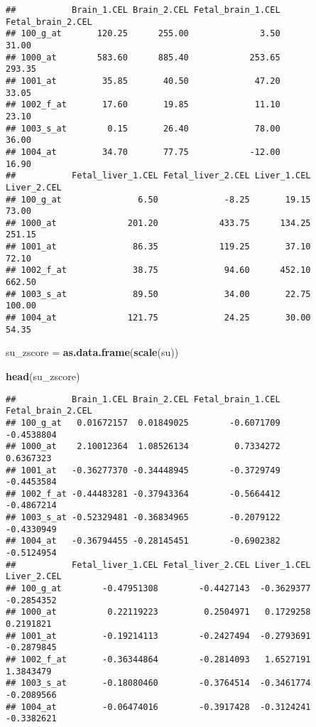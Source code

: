 \documentclass[
]{article}
\newenvironment{Shaded}{\begin{snugshade}}{\end{snugshade}}
\newcommand{\FunctionTok}[1]{\textcolor[rgb]{0.13,0.29,0.53}{\textbf{#1}}}
\newcommand{\NormalTok}[1]{#1}
\newcommand{\OtherTok}[1]{\textcolor[rgb]{0.56,0.35,0.01}{#1}}
\begin{document}
\begin{verbatim}
##           Brain_1.CEL Brain_2.CEL Fetal_brain_1.CEL Fetal_brain_2.CEL
## 100_g_at       120.25      255.00              3.50             31.00
## 1000_at        583.60      885.40            253.65            293.35
## 1001_at         35.85       40.50             47.20             33.05
## 1002_f_at       17.60       19.85             11.10             23.10
## 1003_s_at        0.15       26.40             78.00             36.00
## 1004_at         34.70       77.75            -12.00             16.90
##           Fetal_liver_1.CEL Fetal_liver_2.CEL Liver_1.CEL Liver_2.CEL
## 100_g_at               6.50             -8.25       19.15       73.00
## 1000_at              201.20            433.75      134.25      251.15
## 1001_at               86.35            119.25       37.10       72.10
## 1002_f_at             38.75             94.60      452.10      662.50
## 1003_s_at             89.50             34.00       22.75      100.00
## 1004_at              121.75             24.25       30.00       54.35
\end{verbatim}

\begin{Shaded}
\begin{Highlighting}[]
\NormalTok{su\_zscore }\OtherTok{=} \FunctionTok{as.data.frame}\NormalTok{(}\FunctionTok{scale}\NormalTok{(su))}


\FunctionTok{head}\NormalTok{(su\_zscore)}
\end{Highlighting}
\end{Shaded}

\begin{verbatim}
##           Brain_1.CEL Brain_2.CEL Fetal_brain_1.CEL Fetal_brain_2.CEL
## 100_g_at   0.01672157  0.01849025        -0.6071709        -0.4538804
## 1000_at    2.10012364  1.08526134         0.7334272         0.6367323
## 1001_at   -0.36277370 -0.34448945        -0.3729749        -0.4453584
## 1002_f_at -0.44483281 -0.37943364        -0.5664412        -0.4867214
## 1003_s_at -0.52329481 -0.36834965        -0.2079122        -0.4330949
## 1004_at   -0.36794455 -0.28145451        -0.6902382        -0.5124954
##           Fetal_liver_1.CEL Fetal_liver_2.CEL Liver_1.CEL Liver_2.CEL
## 100_g_at        -0.47951308        -0.4427143  -0.3629377  -0.2854352
## 1000_at          0.22119223         0.2504971   0.1729258   0.2191821
## 1001_at         -0.19214113        -0.2427494  -0.2793691  -0.2879845
## 1002_f_at       -0.36344864        -0.2814093   1.6527191   1.3843479
## 1003_s_at       -0.18080460        -0.3764514  -0.3461774  -0.2089566
## 1004_at         -0.06474016        -0.3917428  -0.3124241  -0.3382621
\end{verbatim}
\end{document}
